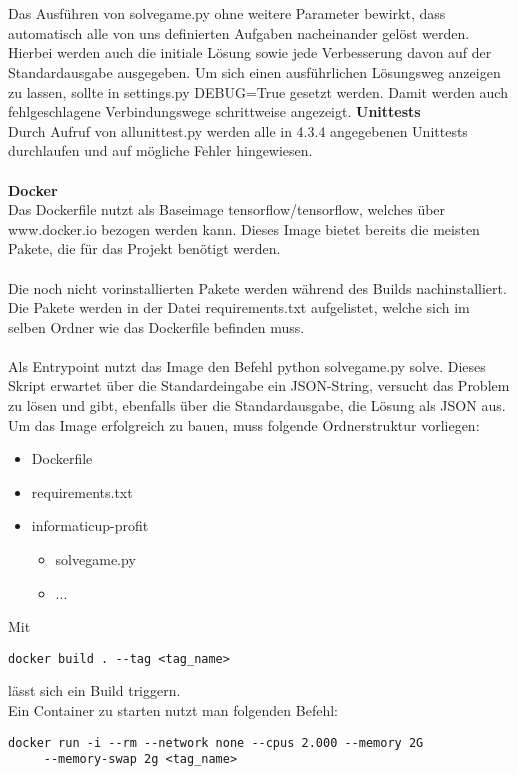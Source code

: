 \\\\
Das Ausführen von solve\textunderscore{}game.py ohne weitere Parameter bewirkt, dass automatisch alle von uns definierten Aufgaben nacheinander gelöst werden. Hierbei werden auch die initiale Lösung sowie jede Verbesserung davon auf der Standardausgabe ausgegeben. Um sich einen ausführlichen Lösungsweg anzeigen zu lassen, sollte in settings.py DEBUG=True gesetzt werden. Damit werden auch fehlgeschlagene Verbindungswege schrittweise angezeigt.
\newpage
\textbf{Unittests}\\
Durch Aufruf von all\textunderscore{}unit\textunderscore{}test.py werden alle in 4.3.4 angegebenen Unittests durchlaufen und auf mögliche Fehler hingewiesen.
\\\\
\textbf{Docker}\\
Das Dockerfile nutzt als Baseimage tensorflow/tensorflow, welches über www.docker.io bezogen werden kann. Dieses Image bietet bereits die meisten Pakete, die für das Projekt benötigt werden.
\\\\
Die noch nicht vorinstallierten Pakete werden während des Builds nachinstalliert. Die Pakete werden in der Datei requirements.txt aufgelistet, welche sich im selben Ordner wie das Dockerfile befinden muss.
\\\\
Als Entrypoint nutzt das Image den Befehl python solve\textunderscore{}game.py solve. Dieses Skript erwartet über die Standardeingabe ein JSON-String, versucht das Problem zu lösen und gibt, ebenfalls über die Standardausgabe, die Lösung als JSON aus.
\\
Um das Image erfolgreich zu bauen, muss folgende Ordnerstruktur vorliegen:
\begin{itemize}
	\item Dockerfile
	\item requirements.txt
	\item informaticup-profit
	\begin{itemize}
		\item solve\textunderscore{}game.py
		\item ...
	\end{itemize}
\end{itemize}

Mit 
\begin{verbatim}docker build . --tag <tag_name>\end{verbatim}
lässt sich ein Build triggern. 
\\
Ein Container zu starten nutzt man folgenden Befehl:
\begin{verbatim}docker run -i --rm --network none --cpus 2.000 --memory 2G
	 --memory-swap 2g <tag_name>\end{verbatim}

